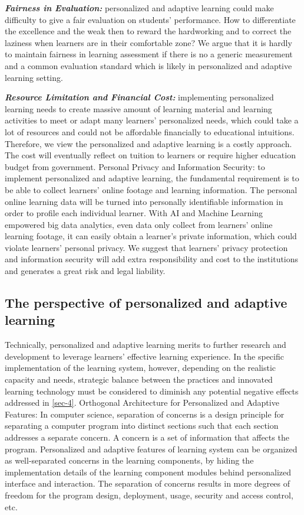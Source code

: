 \documentclass[english]{textolivre}
\begin{document}
\textbf{\emph{Fairness in Evaluation:}} personalized and adaptive learning could make difficulty to give a fair evaluation on students’ performance. How to differentiate the excellence and the weak then to reward the hardworking and to correct the laziness when learners are in their comfortable zone? We argue that it is hardly to maintain fairness in learning assessment if there is no a generic measurement and a common evaluation standard which is likely in personalized and adaptive learning setting.

\textbf{\emph{Resource Limitation and Financial Cost:}} implementing personalized learning needs to create massive amount of learning material and learning activities to meet or adapt many learners’ personalized needs, which could take a lot of resources and could not be affordable financially to educational intuitions. Therefore, we view the personalized and adaptive learning is a costly approach. The cost will eventually reflect on tuition to learners or require higher education budget from government.
Personal Privacy and Information Security: to implement personalized and adaptive learning, the fundamental requirement is to be able to collect learners’ online footage and learning information. The personal online learning data will be turned into personally identifiable information in order to profile each individual learner. With AI and Machine Learning empowered big data analytics, even data only collect from learners’ online learning footage, it can easily obtain a learner’s private information, which could violate learners’ personal privacy. We suggest that learners’ privacy protection and information security will add extra responsibility and cost to the institutions and generates a great risk and legal liability.

\subsection{The perspective of personalized and adaptive learning}\label{subseq-4.3}
Technically, personalized and adaptive learning merits to further research and development to leverage learners’ effective learning experience. In the specific implementation of the learning system, however, depending on the realistic capacity and needs, strategic balance between the practices and innovated learning technology must be considered to diminish any potential negative effects addressed in \cref{sec-4}. Orthogonal Architecture for Personalized and Adaptive Features: In computer science, separation of concerns is a design principle for separating a computer program into distinct sections such that each section addresses a separate concern. A concern is a set of information that affects the program. Personalized and adaptive features of learning system can be organized as well-separated concerns in the learning components, by hiding the implementation details of the learning component modules behind personalized interface and interaction. The separation of concerns results in more degrees of freedom for the program design, deployment, usage, security and access control, etc.
\end{document}
